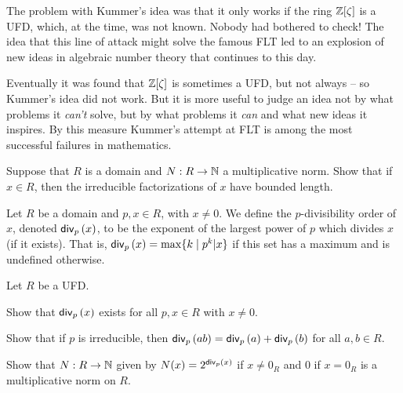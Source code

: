 The problem with Kummer's idea was that it only works if the ring \(\mathbb{Z}[\zeta]\) is a UFD, which, at the time, was not known.
Nobody had bothered to check!
The idea that this line of attack might solve the famous FLT led to an explosion of new ideas in algebraic number theory that continues to this day.

Eventually it was found that \(\mathbb{Z}[\zeta]\) is sometimes a UFD, but not always -- so Kummer's idea did not work.
But it is more useful to judge an idea not by what problems it \emph{can't} solve, but by what problems it \emph{can} and what new ideas it inspires.
By this measure Kummer's attempt at FLT is among the most successful failures in mathematics.



\Exercises%

\begin{exercise}
Suppose that \(R\) is a domain and \(N : R \rightarrow \mathbb{N}\) a multiplicative norm.
Show that if \(x \in R\), then the irreducible factorizations of \(x\) have bounded length.
\end{exercise}

\begin{dfn}
Let \(R\) be a domain and \(p,x \in R\), with \(x \neq 0\).
We define the \(p\)-divisibility order of \(x\), denoted \(\mathsf{div}_{p}\left(x\right)\), to be the exponent of the largest power of \(p\) which divides \(x\) (if it exists).
That is, \(\mathsf{div}_{p}\left(x\right) = \max \{ k \mid p^k | x \}\) if this set has a maximum and is undefined otherwise.
\end{dfn}

\begin{exercise}
Let \(R\) be a UFD.
\begin{proplist}
\item Show that \(\mathsf{div}_{p}\left(x\right)\) exists for all \(p,x \in R\) with \(x \neq 0\).
\item Show that if \(p\) is irreducible, then \(\mathsf{div}_{p}\left(ab\right) = \mathsf{div}_{p}\left(a\right) + \mathsf{div}_{p}\left(b\right)\) for all \(a,b \in R\).
\item Show that \(N : R \rightarrow \mathbb{N}\) given by \(N(x) = 2^{\mathsf{div}_{p}\left(x\right)}\) if \(x \neq 0_R\) and \(0\) if \(x = 0_R\) is a multiplicative norm on \(R\).
\end{proplist}
\end{exercise}
